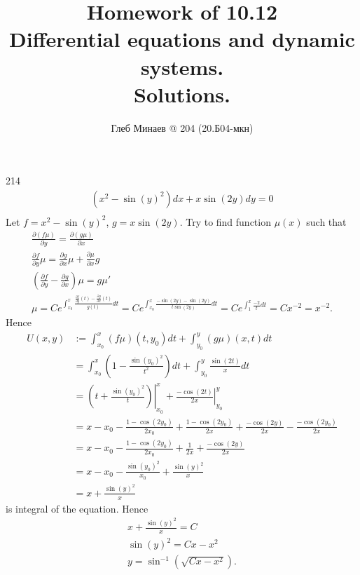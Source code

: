 \documentclass[12pt,a4paper]{article}
\title{Homework of 10.12\\Differential equations and dynamic systems.\\Solutions.}
\author{Глеб Минаев @ 204 (20.Б04-мкн)}
\date{}
\begin{document}
    \maketitle

    \begin{problem}{214}
        \begin{gather*}
            (x^2 - \sin(y)^2)dx + x \sin(2y) dy = 0\\
        \end{gather*}
        Let $f = x^2 - \sin(y)^2$, $g = x \sin(2y)$. Try to find function $\mu(x)$ such that
        \begin{gather*}
            \frac{\partial(f\mu)}{\partial y} = \frac{\partial(g\mu)}{\partial x}\\
            \frac{\partial f}{\partial y} \mu = \frac{\partial g}{\partial x} \mu + \frac{\partial \mu}{\partial x} g\\
            \left(\frac{\partial f}{\partial y} - \frac{\partial g}{\partial x}\right) \mu = g \mu'\\
            \mu = C e^{\int_{x_0}^x \frac{\frac{\partial f}{\partial y}(t) - \frac{\partial g}{\partial x}(t)}{g(t)} dt} = C e^{\int_{x_0}^x \frac{- \sin(2y) - \sin(2y)}{t \sin(2y)} dt} = Ce^{\int_1^x \frac{-2}{t} dt} = C x^{-2} = x^{-2}.
        \end{gather*}
        Hence
        \begin{align*}
            U(x, y)
            &:= \int_{x_0}^x (f\mu)(t, y_0) dt + \int_{y_0}^y (g\mu)(x, t) dt\\
            &= \int_{x_0}^x \left(1 - \frac{\sin(y_0)^2}{t^2}\right) dt + \int_{y_0}^y \frac{\sin(2t)}{x} dt\\
            &= \left.\left(t + \frac{\sin(y_0)^2}{t}\right)\right|_{x_0}^x + \left.\frac{-\cos(2t)}{2x}\right|_{y_0}^{y}\\
            &= x - x_0 - \frac{1 - \cos(2y_0)}{2x_0} + \frac{1 - \cos(2y_0)}{2x} + \frac{-\cos(2y)}{2x} - \frac{-\cos(2y_0)}{2x}\\
            &= x - x_0 - \frac{1 - \cos(2y_0)}{2x_0} + \frac{1}{2x} + \frac{-\cos(2y)}{2x}\\
            &= x - x_0 - \frac{\sin(y_0)^2}{x_0} + \frac{\sin(y)^2}{x}\\
            &= x + \frac{\sin(y)^2}{x}
        \end{align*}
        is integral of the equation. Hence
        \begin{gather*}
            x + \frac{\sin(y)^2}{x} = C\\
            \sin(y)^2 = Cx - x^2\\
            y = \sin^{-1}(\sqrt{Cx - x^2}).
        \end{gather*}
    \end{problem}
\end{document}
